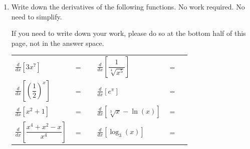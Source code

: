 \documentclass[11pt]{article}
\begin{document}
\begin{enumerate}
\begin{enumerate}
    \[9^{2x - 1} = 81^{2x}\]

    \vfill
\end{enumerate}



\newpage


\item Write down the derivatives of the following functions. No work required. No need to simplify.

If you need to write down your work, please do so at the bottom half of this page, not in the answer space.

\begin{center}
        \begin{tabular}{l c r l c r}
            $\displaystyle\frac{d}{dx}\left[ 3x^{7} \right]$ & $=$ & \rule[-8pt]{1.5in}{0.4pt} &
            \vspace{4cm}
            $\displaystyle\frac{d}{dx}\left[ \dfrac{1}{\sqrt[4]{x^5}} \right]$ & $=$ & \rule[-8pt]{1.5in}{0.4pt}\\[0.3in]
            \vspace{4cm}
            $\displaystyle\frac{d}{dx}\left[ \left(\dfrac{1}{2}\right)^x \right]$ & $=$ & \rule[-8pt]{1.5in}{0.4pt} & 
            $\displaystyle\frac{d}{dx}\left[ e^{\pi} \right]$ & $=$ & \rule[-8pt]{1.5in}{0.4pt}\\[0.3in]
            \vspace{4cm}
            $\displaystyle\frac{d}{dx}\left[ x^2+1 \right]$ & $=$ & \rule[-8pt]{1.5in}{0.4pt}&
            $\displaystyle\frac{d}{dx}\left[ \sqrt[3]{x}-\ln(x) \right]$ & $=$ & \rule[-8pt]{1.5in}{0.4pt}\\[0.3in]
            \vspace{3cm}
            $\displaystyle\frac{d}{dx}\left[ \dfrac{x^4+x^2-x}{x^4} \right]$ & $=$ & \rule[-8pt]{1.5in}{0.4pt} & 
            $\displaystyle\frac{d}{dx}\left[ \log_{3}(x) \right]$ & $=$ & \rule[-8pt]{1.5in}{0.4pt}\\[0.3in]
        \end{tabular}
        

\end{center}
\end{enumerate}
\end{document}

